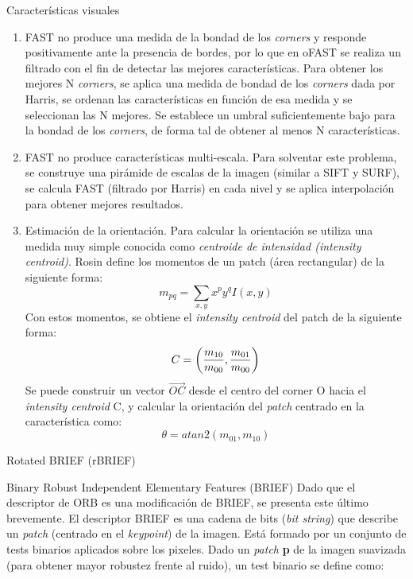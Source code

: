 \begin{section}{Características visuales}
\begin{subsection}
\begin{subsection}
\begin{enumerate}
\item FAST no produce una medida de la bondad de los \textit{corners} y responde positivamente ante la presencia de bordes, por lo que en oFAST se realiza un filtrado con el fin de detectar las mejores características. Para obtener los mejores N \textit{corners}, se aplica una medida de bondad de los \textit{corners} dada por Harris\cite{Harris88alvey}, se ordenan las características en función de esa medida y se seleccionan las N mejores. Se establece un umbral suficientemente bajo para la bondad de los \textit{corners}, de forma tal de obtener al menos N características.

\item FAST no produce características multi-escala. Para solventar este problema, se construye una pirámide de escalas de la imagen (similar a SIFT y SURF), se calcula FAST (filtrado por Harris) en cada nivel y se aplica interpolación para obtener mejores resultados.

\item Estimación de la orientación. Para calcular la orientación se utiliza una medida muy simple conocida como \textit{centroide de intensidad (intensity centroid)}. Rosin\cite{Rosin99measuringcorner} define los momentos de un patch (área rectangular) de la siguiente forma:
\begin{equation}
m_{pq} = \sum_{x,y} x^{p}y^{q}I(x,y)
\end{equation}
Con estos momentos, se obtiene el \textit{intensity centroid} del patch de la siguiente forma:
\begin{equation}
C = \left(
\frac{m_{10}}{m_{00}} , \frac{m_{01}}{m_{00}} \\
\right)
\end{equation}
Se puede construir un vector $\vec{OC}$ desde el centro del corner O hacia el \textit{intensity centroid} C, y calcular la orientación del \textit{patch} centrado en la característica como:
\begin{equation}
\theta = atan2(m_{01}, m_{10})
\end{equation}

\end{enumerate}
\end{subsection}

\begin{subsection}
{Rotated BRIEF (rBRIEF)}
\begin{subsection}
{Binary Robust Independent Elementary Features (BRIEF)}
Dado que el descriptor de ORB es una modificación de BRIEF, se presenta este último brevemente. El descriptor BRIEF\cite{Calonder12} es una cadena de bits (\textit{bit string}) que describe un \textit{patch} (centrado en el \textit{\textsl{keypoint}}) de la imagen. Está formado por un conjunto de tests binarios aplicados sobre los pixeles. Dado un \textit{patch} \textbf{p} de la imagen suavizada (para obtener mayor robustez frente al ruido), un test binario se define como:


\end{subsection}
\end{subsection}
\end{subsection}
\end{section}
